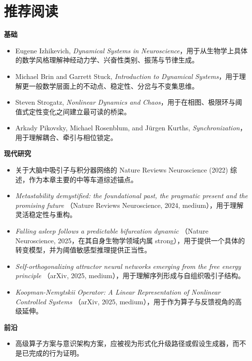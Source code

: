 \section{推荐阅读}

\begin{readingbox}
\textbf{基础}
\begin{itemize}[nosep]
  \item Eugene Izhikevich, \emph{Dynamical Systems in Neuroscience}，用于从生物学上具体的数学风格理解神经动力学、兴奋性类别、振荡与节律生成。
  \item Michael Brin and Garrett Stuck, \emph{Introduction to Dynamical
        Systems}，用于理解更一般数学层面上的不动点、稳定性、分岔与不变集思维。
  \item Steven Strogatz, \emph{Nonlinear Dynamics and Chaos}，用于在相图、极限环与阈值式定性变化之间建立最可读的桥梁。
  \item Arkady Pikovsky, Michael Rosenblum, and J\"urgen Kurths,
        \emph{Synchronization}，用于理解耦合、牵引与相位锁定。
\end{itemize}
\textbf{现代研究}
\begin{itemize}[nosep]
  \item 关于大脑中吸引子与积分器网络的 Nature Reviews Neuroscience
        (2022) 综述，作为本章主要的中等车道综述锚点。
  \item \emph{Metastability demystified: the foundational past, the pragmatic
        present and the promising future} （Nature Reviews Neuroscience, 2024,
        medium），用于理解灵活稳定性与重构。
  \item \emph{Falling asleep follows a predictable bifurcation dynamic}
        （Nature Neuroscience, 2025，在其自身生物学领域内属 strong），用于提供一个具体的转变模型，并为阈值敏感型推理提供正当性。
  \item \emph{Self-orthogonalizing attractor neural networks emerging from the
        free energy principle} （arXiv, 2025, medium），用于理解序列形成与自组织吸引子结构。
  \item \emph{Koopman-Nemytskii Operator: A Linear Representation of Nonlinear
        Controlled Systems} （arXiv, 2025, medium），用于作为算子与反馈视角的高级延伸。
\end{itemize}
\textbf{前沿}
\begin{itemize}[nosep]
  \item 高级算子方案与意识架构方案，应被视为形式化升级路径或假设生成器，而不是已完成的行为证明。
\end{itemize}
\end{readingbox}